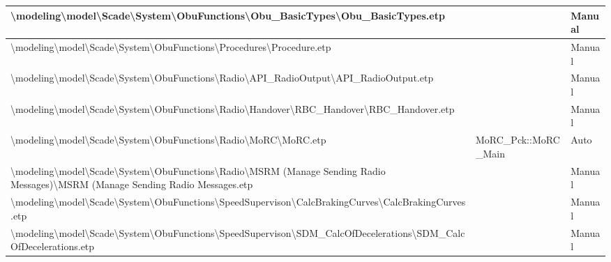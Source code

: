 \begin{longtable}{|>{\RaggedRight}p{}|>{\RaggedRight}p{}|>{\RaggedRight}p{}|}
\hline
\textbackslash modeling\textbackslash \allowbreak model\textbackslash \allowbreak Scade\textbackslash \allowbreak System\textbackslash \allowbreak ObuFunctions\textbackslash \allowbreak Obu\_\allowbreak BasicTypes\textbackslash \allowbreak Obu\_\allowbreak BasicTypes.etp& &Manual\\
\hline
\textbackslash modeling\textbackslash \allowbreak model\textbackslash \allowbreak Scade\textbackslash \allowbreak System\textbackslash \allowbreak ObuFunctions\textbackslash \allowbreak Procedures\textbackslash \allowbreak Procedure.etp& &Manual\\
\hline
\textbackslash modeling\textbackslash \allowbreak model\textbackslash \allowbreak Scade\textbackslash \allowbreak System\textbackslash \allowbreak ObuFunctions\textbackslash \allowbreak Radio\textbackslash \allowbreak API\_\allowbreak RadioOutput\textbackslash \allowbreak API\_\allowbreak RadioOutput.etp& &Manual\\
\hline
\textbackslash modeling\textbackslash \allowbreak model\textbackslash \allowbreak Scade\textbackslash \allowbreak System\textbackslash \allowbreak ObuFunctions\textbackslash \allowbreak Radio\textbackslash \allowbreak Handover\textbackslash \allowbreak RBC\_\allowbreak Handover\textbackslash \allowbreak RBC\_\allowbreak Handover.etp& &Manual\\
\hline
\textbackslash modeling\textbackslash \allowbreak model\textbackslash \allowbreak Scade\textbackslash \allowbreak System\textbackslash \allowbreak ObuFunctions\textbackslash \allowbreak Radio\textbackslash \allowbreak MoRC\textbackslash \allowbreak MoRC.etp&MoRC\_\allowbreak Pck::MoRC\_\allowbreak Main&Auto\\
\hline
\textbackslash modeling\textbackslash \allowbreak model\textbackslash \allowbreak Scade\textbackslash \allowbreak System\textbackslash \allowbreak ObuFunctions\textbackslash \allowbreak Radio\textbackslash \allowbreak MSRM (Manage Sending Radio Messages)\textbackslash \allowbreak MSRM (Manage Sending Radio Messages.etp& &Manual\\
\hline
\textbackslash modeling\textbackslash \allowbreak model\textbackslash \allowbreak Scade\textbackslash \allowbreak System\textbackslash \allowbreak ObuFunctions\textbackslash \allowbreak SpeedSupervison\textbackslash \allowbreak CalcBrakingCurves\textbackslash \allowbreak CalcBrakingCurves.etp& &Manual\\
\hline
\textbackslash modeling\textbackslash \allowbreak model\textbackslash \allowbreak Scade\textbackslash \allowbreak System\textbackslash \allowbreak ObuFunctions\textbackslash \allowbreak SpeedSupervison\textbackslash \allowbreak SDM\_\allowbreak CalcOfDecelerations\textbackslash \allowbreak SDM\_\allowbreak CalcOfDecelerations.etp& &Manual\\

\end{longtable}
